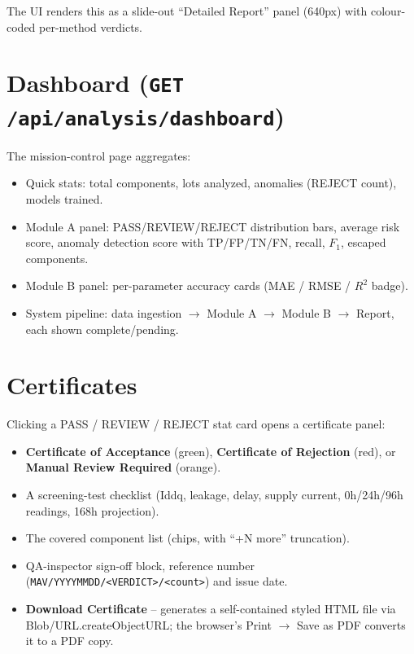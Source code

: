 \documentclass[11pt,a4paper]{article}
\newcommand{\code}[1]{\texttt{\small #1}}
\begin{document}
The UI renders this as a slide-out ``Detailed Report'' panel
(640px) with colour-coded per-method verdicts.

\section{Dashboard (\code{GET /api/analysis/dashboard})}
\label{sec:dash}

The mission-control page aggregates:
\begin{itemize}[leftmargin=1.5em]
  \item Quick stats: total components, lots analyzed, anomalies (REJECT count), models trained.
  \item Module A panel: PASS/REVIEW/REJECT distribution bars, average risk score, anomaly
        detection score with TP/FP/TN/FN, recall, $F_1$, escaped components.
  \item Module B panel: per-parameter accuracy cards (MAE / RMSE / $R^2$ badge).
  \item System pipeline: data ingestion $\rightarrow$ Module A $\rightarrow$ Module B
        $\rightarrow$ Report, each shown complete/pending.
\end{itemize}

\section{Certificates}
\label{sec:cert}

Clicking a PASS / REVIEW / REJECT stat card opens a certificate panel:
\begin{itemize}[leftmargin=1.5em]
  \item \textbf{Certificate of Acceptance} (green), \textbf{Certificate of Rejection} (red), or
        \textbf{Manual Review Required} (orange).
  \item A screening-test checklist (Iddq, leakage, delay, supply current, 0h/24h/96h readings,
        168h projection).
  \item The covered component list (chips, with ``+N more'' truncation).
  \item QA-inspector sign-off block, reference number
        (\code{MAV/YYYYMMDD/<VERDICT>/<count>}) and issue date.
  \item \textbf{Download Certificate} -- generates a self-contained styled HTML file via
        Blob/URL.createObjectURL; the browser's Print $\rightarrow$ Save as PDF converts it to a
        PDF copy.
\end{itemize}
\end{document}
